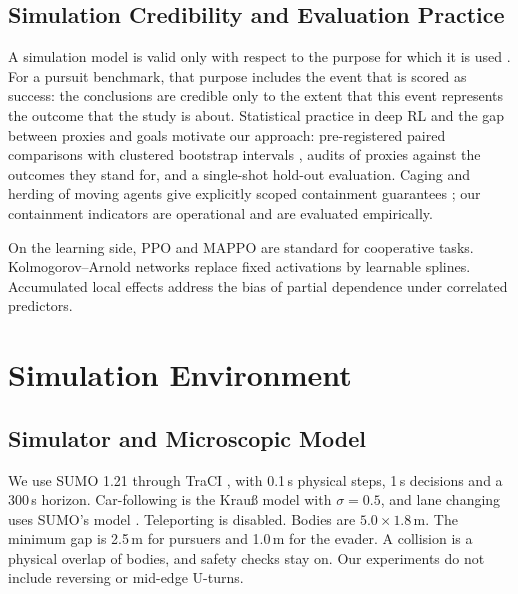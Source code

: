 \documentclass[5p,twocolumn]{elsarticle}
\begin{document}
\subsection{Simulation Credibility and Evaluation Practice}

A simulation model is valid only with respect to the purpose for which it is used \cite{sargent2013}. For a
pursuit benchmark, that purpose includes the event that is scored as success: the conclusions are credible only to
the extent that this event represents the outcome that the study is about. Statistical practice in deep RL \cite{agarwal2021,henderson2018} and the gap between proxies and goals
\cite{skalse2022} motivate our approach: pre-registered paired comparisons with clustered bootstrap intervals
\cite{efron1993}, audits of proxies against the outcomes they stand for, and a single-shot hold-out evaluation.
Caging and herding of moving agents give explicitly scoped containment guarantees \cite{varava2017}; our containment
indicators are operational and are evaluated empirically.

On the learning side, PPO \cite{schulman2017ppo} and MAPPO \cite{yu2022mappo,lowe2017maddpg} are standard for
cooperative tasks. Kolmogorov--Arnold networks \cite{liu2025kan} replace fixed activations by learnable splines.
Accumulated local effects \cite{apley2020ale} address the bias of partial dependence under correlated predictors.

\section{Simulation Environment}
\label{sec:setting}

\subsection{Simulator and Microscopic Model}

We use SUMO 1.21 through TraCI \cite{lopez2018sumo}, with 0.1\,s physical steps, 1\,s decisions and a 300\,s horizon.
Car-following is the Krau{\ss} model \cite{krauss1998} with $\sigma=0.5$, and lane changing uses SUMO's model
\cite{erdmann2015}. Teleporting is disabled. Bodies are $5.0\times1.8$\,m. The minimum gap is 2.5\,m for pursuers and
1.0\,m for the evader. A collision is a physical overlap of bodies, and safety checks stay on. Our experiments do not
include reversing or mid-edge U-turns.
\end{document}
